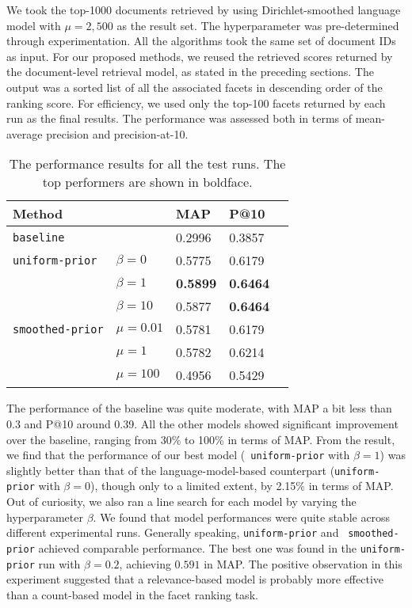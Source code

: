 We took the top-1000 documents retrieved by using Dirichlet-smoothed language
model with $\mu = 2,500$ as the result set.  The hyperparameter was
pre-determined through experimentation.  All the algorithms took the same set
of document IDs as input.  For our proposed methods, we reused the retrieved
scores returned by the document-level retrieval model, as stated in the
preceding sections.  The output was a sorted list of all the associated facets
in descending order of the ranking score.  For efficiency, we used only the
top-100 facets returned by each run as the final results.  The performance was
assessed both in terms of mean-average precision and precision-at-10.

\begin{table}[ht!]
  \caption{The performance results for all the test runs.  The top performers are
  shown in boldface.} \label{t:performance}
  \centering
  \begin{tabular}{lllll}
    Method & & MAP & P@10 & \\
    \hline
    {\tt baseline} & & 0.2996 & 0.3857 & \\
    {\tt uniform-prior} & $\beta = 0$ & 0.5775 & 0.6179 & \\
    & $\beta = 1$ & {\bf 0.5899} & {\bf 0.6464} & \\
    & $\beta = 10$ & 0.5877 & {\bf 0.6464} & \\
    {\tt smoothed-prior} & $\mu = 0.01$ & 0.5781 & 0.6179 &\\
    & $\mu = 1$ & 0.5782 & 0.6214 & \\
    & $\mu = 100$ & 0.4956 & 0.5429 &
  \end{tabular}
\end{table}

The performance of the baseline was quite moderate, with MAP a bit less
than 0.3 and P@10 around 0.39.  All the other models showed significant
improvement over the baseline, ranging from 30\% to 100\% in terms of MAP.
From the result, we find that the performance of our best model ({\tt
uniform-prior} with $\beta = 1$) was slightly better than that of the
language-model-based counterpart ({\tt uniform-prior}
with $\beta = 0$), though only to a limited extent, by 2.15\% in terms of MAP.
Out of curiosity, we also ran a line search for each model by varying the
hyperparameter $\beta$.  We found that model performances were quite stable
across different experimental runs.  Generally speaking, {\tt uniform-prior} and {\tt
smoothed-prior} achieved comparable performance.  The best one was found in the
{\tt uniform-prior} run with $\beta = 0.2$, achieving $0.591$ in MAP.  The
positive observation in this experiment suggested that a relevance-based
model is probably more effective than a count-based model in the
facet ranking task.  

